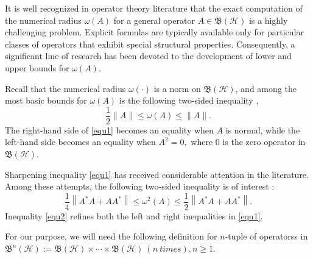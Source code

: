\documentclass[12pt]{article}
\begin{document}
It is well recognized in operator theory literature that the exact computation of the numerical radius $\omega(A)$ for a general operator $A \in \mathfrak{B}(\mathcal{H})$ is a highly challenging problem.
Explicit formulas are typically available only for particular classes of operators that exhibit special structural properties.
Consequently, a significant line of research has been devoted to the development of lower and upper bounds for $\omega(A)$.

Recall that the numerical radius $\omega(\cdot)$ is a norm on $\mathfrak{B}(\mathcal{H})$, and among the most basic bounds for $\omega(A)$ is the following two-sided inequality \cite{Halmos1982},
\begin{equation}
\label{equ1}
    \frac{1}{2}\|A\| \leq \omega(A) \leq \|A\|.
\end{equation}
The right-hand side of \eqref{equ1} becomes an equality when $A$ is normal, while the left-hand side becomes an equality when $A^{2} = 0,$ where $0$ is the zero operator in $\mathfrak{B}(\mathcal{H})$.

Sharpening inequality \eqref{equ1} has received considerable attention in the literature. Among these attempts, the following two-sided inequality is of interest \cite{Kittaneh2005}:
\begin{equation}
\label{equ2}
    \frac{1}{4}\left\|A^{*}A + AA^{*}\right\|
    \leq \omega^{2}(A)
    \leq \frac{1}{2}\left\|A^{*}A + AA^{*}\right\|.
\end{equation}
Inequality \eqref{equ2} refines both the left and right inequalities in \eqref{equ1}.

For our purpose, we will need the following definition for $n$-tuple of operatorss in $   \mathfrak{B}^{n}(\mathcal{H}) := \mathfrak{B}(\mathcal{H}) \times \cdots \times
\mathfrak{B}(\mathcal{H}) \ (n \ times), n\geq 1.$
\end{document}
